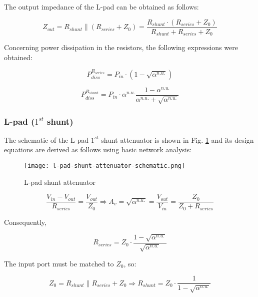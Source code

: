 \noindent The output impedance of the L-pad can be obtained as follows:

\begin{equation}
    Z_{out} = R_{shunt} \parallel \left( R_{series} + Z_0 \right) = \frac{R_{shunt} \cdot \left( R_{series} + Z_0 \right)}{R_{shunt} + R_{series} + Z_0}
\end{equation}

\noindent Concerning power dissipation in the resistors, the following expressions were obtained:

\begin{equation}
    P_{diss}^{R_{series}} = P_{in} \cdot \left( 1 - \sqrt{\alpha^{n.u.}} \right)
\end{equation}

\begin{equation}
    P_{diss}^{R_{shunt}} = P_{in} \cdot \alpha^{n.u.} \frac{1 - \alpha^{n.u.}}{\alpha^{n.u.} + \sqrt{\alpha^{n.u.}}}
\end{equation}
\subsubsection{L-pad ($1^{st}$ shunt)}

\noindent The schematic of the L-pad $1^{st}$ shunt attenuator is shown in Fig. \ref{fig:l-pad-shunt-attenuator-schematic} and its design equations are derived as follows using basic network analysis:

\begin{figure}[ht]
    \centering
    \texttt{[image: l-pad-shunt-attenuator-schematic.png]}
    \caption{L-pad shunt attenuator}
    \label{fig:l-pad-shunt-attenuator-schematic}
\end{figure}

\begin{equation}
    \frac{V_{in} - V_{out}}{R_{series}} = \frac{V_{out}}{Z_0} \Rightarrow A_v = \sqrt{\alpha^{n.u.}} = \frac{V_{out}}{V_{in}} = \frac{Z_0}{Z_0 + R_{series}}
\end{equation}

\noindent Consequently,

\begin{equation}
    R_{series} = Z_0 \cdot \frac{1 - \sqrt{\alpha^{n.u.}}}{\sqrt{\alpha^{n.u.}}}
\end{equation}

\noindent The input port must be matched to $Z_0$, so:

\begin{equation}
    Z_0 = R_{shunt} \parallel R_{series} + Z_0 \Rightarrow R_{shunt} = Z_0 \cdot \frac{1}{1 - \sqrt{\alpha^{n.u.}}}
\end{equation}

